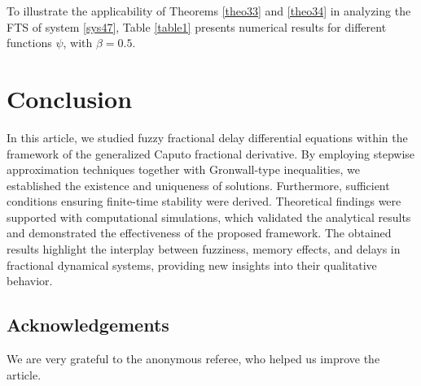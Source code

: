 \documentclass[reqno]{amsart}
\begin{document}
To illustrate the applicability of Theorems \ref{theo33} and \ref{theo34} 
in analyzing the FTS of system \eqref{sys47}, Table \ref{table1} presents
numerical results  for different functions $\psi$, with $\beta = 0.5$.

\section*{Conclusion}
 In this article, we studied fuzzy fractional delay differential equations within 
the framework of the generalized Caputo fractional derivative. By employing stepwise 
approximation techniques together with Gronwall-type inequalities, we established 
the existence and uniqueness of solutions. Furthermore, sufficient conditions 
ensuring finite-time stability were derived. Theoretical findings were supported 
with computational simulations, which validated the analytical results and 
demonstrated the effectiveness of the proposed framework. 
The obtained results highlight the interplay between fuzziness, memory effects, 
and delays in fractional dynamical systems, providing new insights into their 
qualitative behavior.

\subsection*{Acknowledgements}
We are very grateful to the anonymous referee, who helped us improve the article.
\end{document}
